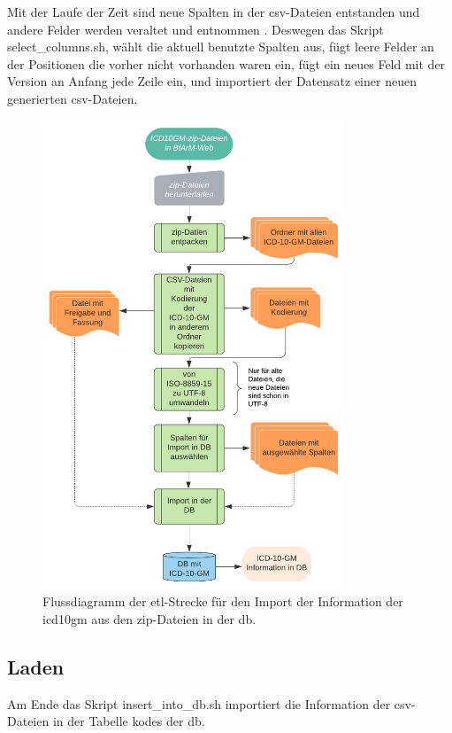 Mit der Laufe der Zeit sind neue Spalten in der \ac{csv}-Dateien entstanden und andere Felder werden veraltet und entnommen \cite{readme13, readme17}. Deswegen das Skript \textsf{select\_columns.sh}, wählt die aktuell benutzte Spalten aus, fügt leere Felder an der Positionen die vorher nicht vorhanden waren ein, fügt ein neues Feld mit der Version an Anfang jede Zeile ein, und importiert der Datensatz einer neuen generierten \ac{csv}-Dateien.
\begin{figure}[ht]
	\centering
	\includegraphics[height=14cm]{figures/etl}
	\caption[\acs{etl}-Strecke]{Flussdiagramm der \acs{etl}-Strecke für den Import der Information der \ac{icd10gm} aus den \ac{zip}-Dateien in der \ac{db}.}
	\label{fig:etl}
\end{figure} 

\subsection{Laden}

Am Ende das Skript \textsf{insert\_into\_db.sh} importiert die Information der \ac{csv}-Dateien in der Tabelle \textsf{kodes} der \ac{db}.	